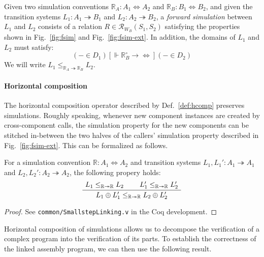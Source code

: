 \documentclass[acmsmall,authordraft]{acmart}
\newcommand{\ifr}[1]{\mathrel{[{#1}]}}
\newcommand{\que}{\circ}
\begin{document}
\begin{definition} \label{def:sim} %
Given
two simulation conventions
$\mathbb{R}_A : A_1 \Leftrightarrow A_2$ and
$\mathbb{R}_B : B_1 \Leftrightarrow B_2$,
and given
the transition systems
$L_1 : A_1 \twoheadrightarrow B_1$ and
$L_2 : A_2 \twoheadrightarrow B_2$,
a \emph{forward simulation} between $L_1$ and $L_2$
consists of a relation
$R \in \mathcal{R}_{W_B}(S_1, S_2)$
satisfying the properties shown in
Fig.~\ref{fig:fsim} and Fig.~\ref{fig:fsim-ext}.
In addition, the domains of $L_1$ and $L_2$
must satisfy:
\[
  ({-} \in D_1)
  \ifr{\Vdash \mathbb{R}_B^\que \rightarrow {\Leftrightarrow}}
  ({-} \in D_2)
\]
We will write $L_1 \le_{\mathbb{R}_A \twoheadrightarrow \mathbb{R}_B} L_2$.
\end{definition}


\paragraph{Horizontal composition} \label{sec:sem:linker} %

The horizontal composition operator
described by Def.~\ref{def:hcomp}
preserves simulations.
Roughly speaking,
whenever new component instances are created
by cross-component calls,
the simulation property for the new components
can be stitched in-between
the two halves of the callers' simulation property
described in Fig.~\ref{fig:fsim-ext}.
This can be formalized as follows.

\begin{theorem} \label{thm:simlinking} %
For a simulation convention
$\mathbb{R} : A_1 \Leftrightarrow A_2$
and transition systems
$L_1, L_1' : A_1 \twoheadrightarrow A_1$ and
$L_2, L_2' : A_2 \twoheadrightarrow A_2$,
the following propery holds:
\[
    \AxiomC{$L_1 \le_{\mathbb{R} \twoheadrightarrow \mathbb{R}} L_2$}
    \AxiomC{$L_1' \le_{\mathbb{R} \twoheadrightarrow \mathbb{R}} L_2'$}
    \BinaryInfC{$L_1 \oplus L_1'
      \le_{\mathbb{R} \twoheadrightarrow \mathbb{R}}
      L_2 \oplus L_2'$}
    \DisplayProof
\]
\begin{proof}
See \texttt{common/SmallstepLinking.v}
in the Coq development.
\end{proof}
\end{theorem}

Horizontal composition of simulations
allows us to decompose the verification of a complex program
into the verification of its parts.
To establish the correctness of the linked assembly program,
we can then use the following result.
\end{document}
